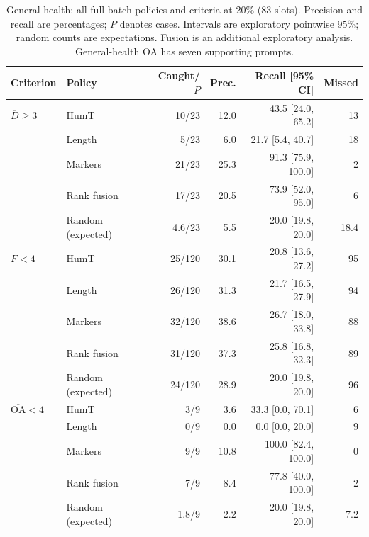 \begin{table}[htbp]
\centering\small
\caption{General health: all full-batch policies and criteria at 20\% (83 slots). Precision and recall are percentages; $P$ denotes cases. Intervals are exploratory pointwise 95\%; random counts are expectations. Fusion is an additional exploratory analysis. General-health OA has seven supporting prompts.}
\label{tab:full_health}
\begin{tabular}{llrrrr}
\toprule
Criterion & Policy & Caught/$P$ & Prec. & Recall [95\% CI] & Missed \\
\midrule
$\overline D\geq3$ & HumT & 10/23 & 12.0 & 43.5 [24.0, 65.2] & 13 \\
 & Length & 5/23 & 6.0 & 21.7 [5.4, 40.7] & 18 \\
 & Markers & 21/23 & 25.3 & 91.3 [75.9, 100.0] & 2 \\
 & Rank fusion & 17/23 & 20.5 & 73.9 [52.0, 95.0] & 6 \\
 & Random (expected) & 4.6/23 & 5.5 & 20.0 [19.8, 20.0] & 18.4 \\
$\overline F<4$ & HumT & 25/120 & 30.1 & 20.8 [13.6, 27.2] & 95 \\
 & Length & 26/120 & 31.3 & 21.7 [16.5, 27.9] & 94 \\
 & Markers & 32/120 & 38.6 & 26.7 [18.0, 33.8] & 88 \\
 & Rank fusion & 31/120 & 37.3 & 25.8 [16.8, 32.3] & 89 \\
 & Random (expected) & 24/120 & 28.9 & 20.0 [19.8, 20.0] & 96 \\
$\overline{\mathrm{OA}}<4$ & HumT & 3/9 & 3.6 & 33.3 [0.0, 70.1] & 6 \\
 & Length & 0/9 & 0.0 & 0.0 [0.0, 20.0] & 9 \\
 & Markers & 9/9 & 10.8 & 100.0 [82.4, 100.0] & 0 \\
 & Rank fusion & 7/9 & 8.4 & 77.8 [40.0, 100.0] & 2 \\
 & Random (expected) & 1.8/9 & 2.2 & 20.0 [19.8, 20.0] & 7.2 \\
\bottomrule
\end{tabular}
\end{table}

